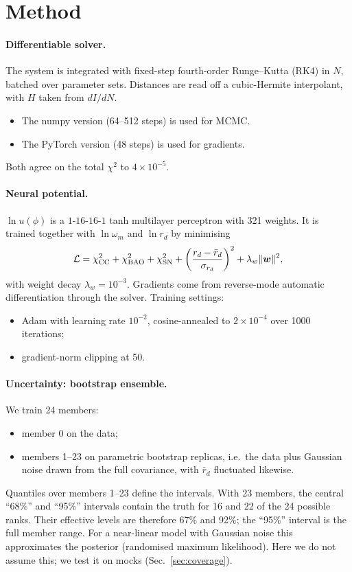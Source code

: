\documentclass[11pt,a4paper]{article}
\begin{document}
\section{Method}\label{sec:method}
\paragraph{Differentiable solver.} The system is integrated with fixed-step fourth-order Runge--Kutta (RK4) in $N$, batched over parameter sets. Distances are read off a cubic-Hermite interpolant, with $H$ taken from $dI/dN$.
\begin{itemize}
\item The numpy version (64--512 steps) is used for MCMC.
\item The PyTorch version (48 steps) is used for gradients.
\end{itemize}
Both agree on the total $\chi^2$ to $4\times10^{-5}$.

\paragraph{Neural potential.} $\ln u(\phi)$ is a $1$-$16$-$16$-$1$ tanh multilayer perceptron with 321 weights. It is trained together with $\ln\omega_m$ and $\ln r_d$ by minimising
\begin{equation}
\mathcal L=\chi^2_{\rm CC}+\chi^2_{\rm BAO}+\chi^2_{\rm SN}+\left(\frac{r_d-\bar r_d}{\sigma_{r_d}}\right)^2+\lambda_w\|\bm w\|^2 ,
\end{equation}
with weight decay $\lambda_w=10^{-3}$. Gradients come from reverse-mode automatic differentiation through the solver. Training settings:
\begin{itemize}
\item Adam with learning rate $10^{-2}$, cosine-annealed to $2\times10^{-4}$ over 1000 iterations;
\item gradient-norm clipping at 50.
\end{itemize}

\paragraph{Uncertainty: bootstrap ensemble.} We train 24 members:
\begin{itemize}
\item member 0 on the data;
\item members 1--23 on parametric bootstrap replicas, i.e.\ the data plus Gaussian noise drawn from the full covariance, with $\bar r_d$ fluctuated likewise.
\end{itemize}
Quantiles over members 1--23 define the intervals. With 23 members, the central ``68\%'' and ``95\%'' intervals contain the truth for 16 and 22 of the 24 possible ranks. Their effective levels are therefore 67\% and 92\%; the ``95\%'' interval is the full member range. For a near-linear model with Gaussian noise this approximates the posterior (randomised maximum likelihood). Here we do not assume this; we test it on mocks (Sec.~\ref{sec:coverage}).
\end{document}

